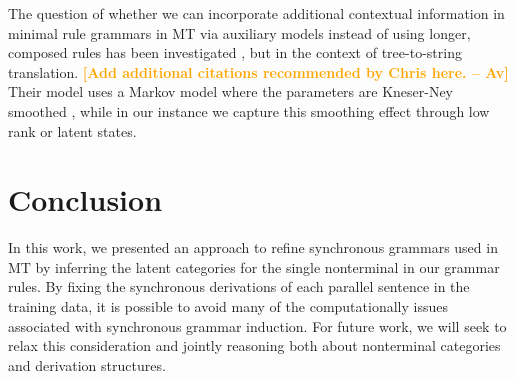 \documentclass[11pt]{article}
\newcommand{\avcomment}[1]{\textcolor{orange}{\textbf{[#1 -- Av]}}}
\begin{document}
The question of whether we can incorporate additional contextual information in minimal rule grammars in MT via auxiliary models instead of using longer, composed rules has been investigated \cite{Vaswani2011}, but in the context of tree-to-string translation. 
\avcomment{Add additional citations recommended by Chris here.}
Their model uses a Markov model where the parameters are Kneser-Ney smoothed \cite{Kneser1993}, while in our instance we capture this smoothing effect through low rank or latent states.  

\section{Conclusion}

In this work, we presented an approach to refine synchronous grammars used in MT by inferring the latent categories for the single nonterminal in our grammar rules. By fixing the synchronous derivations of each parallel sentence in the training data, it is possible to avoid many of the computationally issues associated with synchronous grammar induction. For future work, we will seek to relax this consideration and jointly reasoning both about nonterminal categories and derivation structures.



\end{document}
